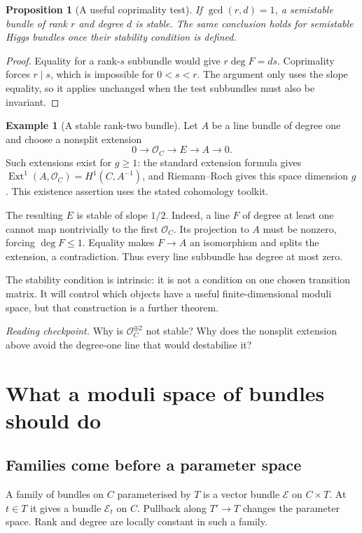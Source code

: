 \documentclass[11pt,a4paper]{article}
\numberwithin{equation}{section}
\newtheorem{proposition}[definition]{Proposition}
\theoremstyle{definition}
\newtheorem{example}[definition]{Example}
\newcommand{\OO}{\mathcal O}
\newcommand{\Ext}{\operatorname{Ext}}
\newcommand{\reading}[1]{\par\smallskip\textit{Reading checkpoint.} #1\par}
\begin{document}
\begin{proposition}[A useful coprimality test]\label{prop:coprime}
If $\gcd(r,d)=1$, a semistable bundle of rank $r$ and degree $d$ is stable.
The same conclusion holds for semistable Higgs bundles once their
stability condition is defined.
\end{proposition}
\begin{proof}
Equality for a rank-$s$ subbundle would give
$r\deg F=ds$. Coprimality forces $r\mid s$, which is impossible for
$0<s<r$. The argument only uses the slope equality, so it applies
unchanged when the test subbundles must also be invariant.
\end{proof}

\begin{example}[A stable rank-two bundle]
Let $A$ be a line bundle of degree one and choose a nonsplit extension
\[
 0\to\OO_C\to E\to A\to0.
\]
Such extensions exist for $g\ge1$: the standard extension formula gives
$\Ext^1(A,\OO_C)=H^1(C,A^{-1})$, and Riemann--Roch gives this space
dimension $g$. This existence assertion uses the stated cohomology toolkit.

The resulting $E$ is stable of slope $1/2$. Indeed, a line $F$ of degree
at least one cannot map nontrivially to the first $\OO_C$. Its projection
to $A$ must be nonzero, forcing $\deg F\le1$. Equality makes $F\to A$
an isomorphism and splits the extension, a contradiction. Thus every
line subbundle has degree at most zero.
\end{example}

The stability condition is intrinsic: it is not a condition on one
chosen transition matrix. It will control which objects have a useful
finite-dimensional moduli space, but that construction is a further theorem.

\reading{Why is $\OO_C^{\oplus2}$ not stable? Why does the nonsplit
extension above avoid the degree-one line that would destabilise it?}

\section{What a moduli space of bundles should do}
\label{sec:moduli}

\subsection{Families come before a parameter space}
A family of bundles on $C$ parameterised by $T$ is a vector bundle
$\mathcal E$ on $C\times T$. At $t\in T$ it gives a bundle
$\mathcal E_t$ on $C$. Pullback along $T'\to T$ changes the parameter
space. Rank and degree are locally constant in such a family.
\end{document}

